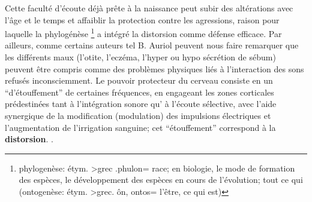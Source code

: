 Cette faculté d'écoute déjà prête à la naissance peut subir des
altérations avec l'âge et
le temps et affaiblir la protection contre les agressions, raison pour
laquelle la phylogénèse \footnote{ phylogenèse: étym. >grec .phulon=
  race; en biologie, le mode de formation des espèces, le développement
  des espèces en cours de l'évolution; tout ce qui (ontogenèse: étym. >grec. ôn, ontos= l'être,
ce qui est)}  a intégré la distorsion comme défense
efficace.
Par ailleurs, comme certains auteurs tel B. Auriol peuvent nous faire
remarquer que 
les différents maux (l'otite, l'eczéma, l'hyper
ou hypo sécrétion de sébum) peuvent être compris comme des problèmes physiques liés à l'interaction des sons refusés
inconsciemment.  \autocite  [19--20] {auriol:cle}
Le pouvoir protecteur du cerveau consiste en un  ``d'étouffement'' de
certaines fréquences,  en engageant les zones corticales prédestinées
tant à 
l'intégration sonore qu' à l'écoute sélective,  avec l'aide synergique de la
modification (modulation) des impulsions électriques et l'augmentation de
l'irrigation sanguine\autocite [14] {auriol:cle}; 
cet ``étouffement'' correspond à la
\textbf{distorsion}.
\autocite{tomatis:education}.

  




  




 




  

